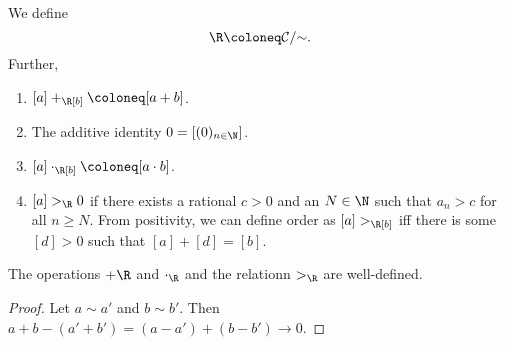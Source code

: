 \begin{definition}[\R] \label{def:R:cauchy}
    We define \[
        \R \coloneq \mathcal{C} /{\sim}.
    \] Further,
    \begin{enumerate}
        \item $[a] +_\R [b] \coloneq [a + b]$.
        \item The additive identity $0 = [(0)_{n \in \N}]$.
        \item $[a] \cdot_\R [b] \coloneq [a \cdot b]$.
        \item $[a] >_\R 0$ if there exists a rational $c > 0$ and an
        $N \in \N$ such that $a_n > c$ for all $n \ge N$.
        From positivity, we can define order as $[a] >_\R [b]$ iff there
        is some $[d] > 0$ such that $[a] + [d] = [b]$.
    \end{enumerate}
\end{definition}
\begin{proposition}
    The operations $+\R$ and $\cdot_\R$ and the relationn $>_\R$ are
    well-defined.
\end{proposition}
\begin{proof}
    Let $a \sim a'$ and $b \sim b'$.
    Then $a + b - (a' + b') = (a - a') + (b - b') \to 0$.
\end{proof}
